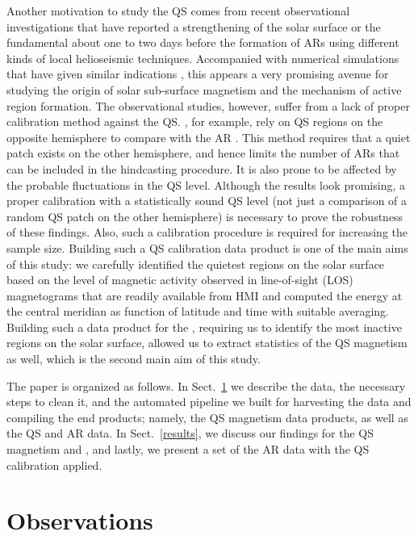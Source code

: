 \documentclass{aa}
\begin{document}
Another motivation to study the QS comes from recent observational investigations \cite[]{SRB16, Waidele22} that have reported 
 a strengthening of the solar surface or the fundamental \fff
about one to two days before
the formation of ARs using different kinds of local helioseismic techniques. Accompanied with numerical simulations that have given similar indications \cite{S+14,S+15,S+20}, this appears a very promising avenue for studying the origin of solar sub-surface magnetism and the mechanism of active region formation. The observational studies, however, suffer from a lack of proper calibration method against the QS. \cite{SRB16}, for example, rely on QS
regions on the opposite hemisphere to compare with the AR \fffns. This method
requires that a quiet patch exists on the other hemisphere, and hence 
limits the number of ARs that can be included in the hindcasting procedure. It is
also prone to be affected by the probable fluctuations in the QS
\fff level. Although the results look promising, a proper calibration with
a statistically sound QS level (not just a comparison of a random QS patch on the
other hemisphere) is necessary to prove the robustness of these findings. Also,
such a calibration procedure is required for increasing the sample size. 
Building such a QS calibration data product is one of the main aims of this
study: we carefully identified the quietest regions on the solar surface based on the level of magnetic activity observed in
line-of-sight (LOS) magnetograms that are readily available from HMI and
computed the \fff 
energy
at the central meridian as function of latitude
and time with suitable averaging. Building such a data product for the \fffns, requiring us to identify the most
inactive regions on the solar surface, allowed us to extract statistics
of the QS magnetism as well, which is the second main aim of this study.

The paper is organized as follows. In Sect.~\ref{pipeline} we describe
the data, the necessary steps to 
clean it, and the automated pipeline we built for harvesting the data and compiling the end products; namely, the QS magnetism data products, as well as the QS and AR \fff data. In
Sect.~\ref{results}, we discuss our findings for the QS magnetism and \fffns, and  lastly, we present a set of the AR data with the QS calibration
applied. 

\section{Observations}\label{pipeline}
\end{document}
